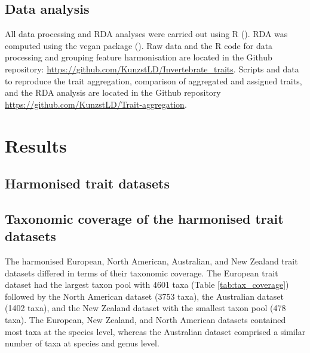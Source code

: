 \documentclass{article}
\begin{document}

\subsection*{Data analysis}

All data processing and RDA analyses were carried out using R (\cite{cite_R}). RDA was computed using the vegan package (\cite{cite_vegan}). Raw data and the R code for data processing and grouping feature harmonisation are located in the Github repository: \url{https://github.com/KunzstLD/Invertebrate_traits}. Scripts and data to reproduce the trait aggregation, comparison of aggregated and assigned traits, and the RDA analysis are located in the Github repository \url{https://github.com/KunzstLD/Trait-aggregation}.

\newpage


\section*{Results}

\subsection*{Harmonised trait datasets}

\subsection*{Taxonomic coverage of the harmonised trait datasets}

The harmonised European, North American, Australian, and New Zealand trait datasets differed in terms of their taxonomic coverage. The European trait dataset had the largest taxon pool with 4601 taxa (Table \ref{tab:tax_coverage}) followed by the North American dataset (3753 taxa), the Australian dataset (1402 taxa), and the New Zealand dataset with the smallest taxon pool (478 taxa). The European, New Zealand, and North American datasets contained most taxa at the species level, whereas the Australian dataset comprised a similar number of taxa at species and genus level.
\end{document}
